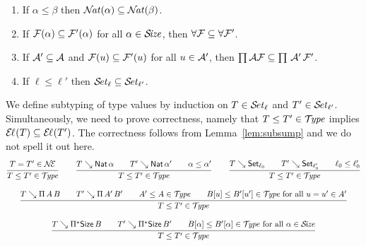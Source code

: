 \documentclass[acmlarge,review,anonymous]{acmart}\settopmatter{printfolios=true}
\newcommand{\LONGVERSION}[1]{}
\begin{document}
\begin{lemma}[Subsumption]
\label{lem:subsump} \hfill
\begin{enumerate}
\item \label{it:natsub} If\/ $\alpha \leq \beta$ then $\NAT(\alpha) \subseteq \NAT(\beta)$.
\item \label{it:allsub} If\/ $\F(\alpha) \subseteq \F'(\alpha)$ for all $\alpha \in \SIZE$, then $\FORALL \F \subseteq \FORALL \F'$.
\item \label{it:pisub}  If\/ $\A' \subseteq \A$ and $\F(u) \subseteq \F'(u)$ for all $u \in \A'$, then $\PIAF \subseteq \PI\,\A'\,\F'$.
\item \label{it:usub}  If\/ $\ell \leq \ell'$ then $\SET[\ell] \subseteq \SET[\ell']$.
\end{enumerate}
\end{lemma}
\LONGVERSION{
\begin{proof}
  Propositions (\ref{it:natsub}--\ref{it:pisub}) are clear.
  For (\ref{it:usub}), prove $T = T' \in \SET[\ell']$ by induction on $T = T' \in \SET[\ell]$.
  For the base types this is direct, let us look at the function space.
\[
  \rul{T \evalsto \piT A B \qquad
      T' \evalsto \piT{A'}{B'} \qquad
      A = A' \in \SET[\ell] \qquad
      B[u] = B'[u'] \in \SET[\ell] \mforall u = u' \in \EL[\ell](A)
    }{T = T' \in \SET[\ell]}
\]
  By induction hypothesis, $A = A' \in \SET[\ell']$, and we have $\EL[\ell'](A) = \EL[\ell](A)$ by Lemma~\ref{lem:indep}.  Assuming $u = u' \in \EL(A)$, we get $B[u] = B'[u'] \in \SET[\ell']$ by induction hypothesis on $B[u] = B'[u'] \in \SET[\ell]$.
\end{proof}
}
We define subtyping of type values  by induction on $T \in \SET[\ell]$ and $T' \in \SET[\ell']$.
Simultaneously, we need to prove correctness, namely that $T \leq T' \in \TYPE$ implies $\EL(T) \subseteq \EL(T')$.  The correctness follows from Lemma~\ref{lem:subsump} and we do not spell it out here.
\begin{gather*}
  \ru{T = T' \in \NEE
    }{T \leq T' \in \TYPE}
\qquad
  \ru{T \evalsto \Nat \alpha \qquad
      T' \evalsto \Nat \alpha' \qquad
      \alpha \leq \alpha'
    }{T \leq T' \in \TYPE}
\qquad
  \ru{T \evalsto \Set[\ell_0] \qquad
      T' \evalsto \Set[\ell_0'] \qquad
      \ell_0 \leq \ell_0'
    }{T \leq T' \in \TYPE}
\\[2ex]
  \ru{T \evalsto \piT A B \qquad
      T' \evalsto \piT {A'}{B'} \qquad
      A' \leq A \in \TYPE \qquad
      B[u] \leq B'[u'] \in \TYPE \mforall u = u' \in A'
    }{T \leq T' \in \TYPE}
\\[2ex]
  \ru{T \evalsto \epiT \Size B \qquad
      T' \evalsto \epiT {\Size}{B'} \qquad
      B[\alpha] \leq B'[\alpha] \in \TYPE \mforall \alpha \in \SIZE
    }{T \leq T' \in \TYPE}
\end{gather*}
\end{document}
